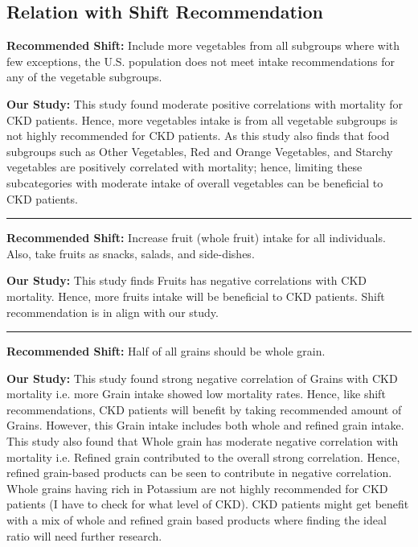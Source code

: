 \subsection{Relation with Shift Recommendation}

\noindent \noindent \textbf{Recommended Shift:} Include more vegetables from all subgroups where with few exceptions, the U.S. population does not meet intake recommendations for any of the vegetable subgroups. 

\noindent \textbf{Our Study:} This study found moderate positive correlations with mortality for CKD patients. Hence, more vegetables intake is from all vegetable subgroups is not highly recommended  for CKD patients. As this study also finds that food subgroups such as Other Vegetables, Red and Orange Vegetables, and Starchy vegetables are positively correlated with mortality; hence, limiting these subcategories with moderate intake of overall vegetables can be beneficial to CKD patients. 

\noindent\rule{7.8cm}{0.4pt}

\noindent \textbf{Recommended Shift:} Increase fruit (whole fruit) intake for all individuals. Also, take fruits as snacks, salads, and side-dishes.

\noindent \textbf{Our Study:} This study finds Fruits has negative correlations with CKD mortality. Hence, more fruits intake will be beneficial to CKD patients. Shift recommendation is in align with our study.

\noindent\rule{7.8cm}{0.4pt}

\noindent \textbf{Recommended Shift:} Half of all grains should be whole grain.

\noindent \textbf{Our Study:} This study found strong negative correlation of Grains with CKD mortality i.e. more Grain intake showed low mortality rates. Hence, like shift recommendations, CKD patients will benefit by taking recommended amount of Grains. However, this Grain intake includes both whole and refined grain intake. This study also found that Whole grain has moderate negative correlation with mortality i.e. Refined grain contributed to the overall strong correlation. Hence, refined grain-based products can be seen to contribute in negative correlation. Whole grains having rich in Potassium are not highly recommended for CKD patients (I have to check for what level of CKD). CKD patients might get benefit with a mix of whole and refined grain based products where finding the ideal ratio will need further research.

